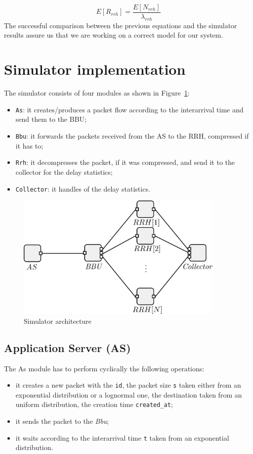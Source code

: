 \documentclass[11pt,a4paper,oneside, openright]{article}
\begin{document}
$$ E[R_{rrh}] = \frac{E[N_{rrh}]}{\lambda_{rrh}} $$
The successful comparison between the previous equations and the simulator results assure us that we are working on a correct model for our system.

\section{Simulator implementation}
The simulator consists of four modules as shown in Figure~\ref{fig:simulator}:
\begin{itemize}
  \item \texttt{As}: it creates/produces a packet flow according to the interarrival time and send them to the BBU;
  \item \texttt{Bbu}: it forwards the packets received from the AS to the RRH, compressed if it has to;
  \item \texttt{Rrh}: it decompresses the packet, if it was compressed, and send it to the collector for the delay statistics;
  \item \texttt{Collector}: it handles of the delay statistics.
\end{itemize}

\begin{figure}[h]
    \centering
    \includegraphics[width=0.9\textwidth]{images/simulator}
    \caption{Simulator architecture}
    \label{fig:simulator}
\end{figure}

\subsection{Application Server (AS)}
The As module has to perform cyclically the following operations:
\begin{itemize}
    \item[1.] it creates a new packet with the \texttt{id}, the packet size \texttt{s} taken either from an exponential distribution or a lognormal one, the destination taken from an uniform distribution, the creation time \texttt{created\_at};
    \item[2.] it sends the packet to the \textit{Bbu};
    \item[3.] it waits according to the interarrival time \texttt{t} taken from an exponential distribution.
\end{itemize}
\end{document}
